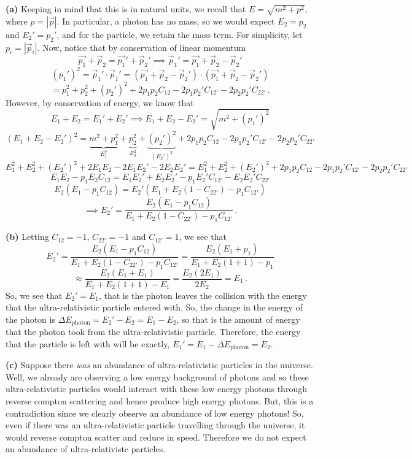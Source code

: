 \documentclass[10pt]{article}
\begin{document}
\textbf{(a)} Keeping in mind that this is in natural units, we recall that $E = \sqrt{m^{2} + p^{2}}$, where $p = |\vec{p}|$. In particular, a photon has no mass, so we would expect $E_{2} = p_{2}$ and $E_{2}' = p_{2}'$, and for the particle, we retain the mass term. For simplicity, let $p_{i} = |\vec{p}_{i}|$. Now, notice that by conservation of linear momentum
\[ \vec{p_{1}} + \vec{p}_{2} = \vec{p_{1}}' + \vec{p}_{2}' \implies \vec{p}_{1}' = \vec{p_{1}} + \vec{p}_{2}  - \vec{p}_{2}'\]
\[ (p_{1}')^{2} = \vec{p}_{1}' \cdot \vec{p}_{1}' = \left(\vec{p_{1}} + \vec{p}_{2}  - \vec{p}_{2}'\right)\cdot\left(\vec{p_{1}} + \vec{p}_{2}  - \vec{p}_{2}'\right)\]
\[ = p_{1}^{2} + p_{2}^{2} + (p_{2}')^{2} + 2p_{1}p_{2}C_{12} - 2p_{1}p_{2}'C_{12'} - 2p_{2}p_{2}'C_{22'} \, .\]
However, by conservation of energy, we know that
\[ E_{1} + E_{2} = E_{1}' + E_{2}' \implies E_{1} + E_{2} - E_{2}' = \sqrt{m^{2} +( p_{1}')^{2}}\]
\[ \left(E_{1} + E_{2} - E_{2}'\right)^{2} = \underbrace{m^{2} +  p_{1}^{2}}_{E_{1}^{2}} + \underbrace{p_{2}^{2}}_{E_{2}^{2}} + \underbrace{(p_{2}')^{2}}_{(E_{2}')^{2}} + 2p_{1}p_{2}C_{12} - 2p_{1}p_{2}'C_{12'} - 2p_{2}p_{2}'C_{22'}\]
\[ E_{1}^{2} + E_{2}^{2} + (E_{2}')^{2} + 2E_{1}E_{2} - 2E_{1}E_{2}' - 2E_{2}E_{2}' =  E_{1}^{2} + E_{2}^{2} + (E_{2}')^{2} + 2p_{1}p_{2}C_{12} - 2p_{1}p_{2}'C_{12'} - 2p_{2}p_{2}'C_{22'}\]
\[ E_{1}E_{2} - p_{1}E_{2}C_{12} =  E_{1}E_{2}' + E_{2}E_{2}' - p_{1}E_{2}'C_{12'} - E_{2}E_{2}'C_{22'}\]
\[ E_{2}(E_{1} - p_{1}C_{12}) = E_{2}'(E_{1} + E_{2}(1 - C_{22'}) - p_{1}C_{12'}) \]
\[ \implies E_{2}' = \frac{E_{2}(E_{1} - p_{1}C_{12})}{E_{1} + E_{2}(1 - C_{22'}) - p_{1}C_{12'}} \, .\]

\textbf{(b)} Letting $C_{12} = -1$, $C_{22'} = -1$ and $C_{12'} = 1$, we see that
\[ E_{2}' = \frac{E_{2}(E_{1} - p_{1}C_{12})}{E_{1} + E_{2}(1 - C_{22'}) - p_{1}C_{12'}} = \frac{E_{2}(E_{1} + p_{1})}{E_{1} + E_{2}(1 + 1) - p_{1}} \]
\[\approx \frac{E_{2}(E_{1} + E_{1})}{E_{1} + E_{2}(1 + 1) - E_{1}} = \frac{E_{2}(2E_{1})}{2E_{2}} = E_{1} \, .\]
So, we see that $E_{2}' = E_{1}$, that is the photon leaves the collision with the energy that the ultra-relativistic particle entered with. So, the change in the energy of the photon is $\Delta E_{\text{photon}} = E_{2}' - E_{2} = E_{1} - E_{2}$, so that is the amount of energy that the photon took from the ultra-relativistic particle. Therefore, the energy that the particle is left with will be exactly, $E_{1}' = E_{1} - \Delta E_{\text{photon}} = E_{2}$.

\textbf{(c)} Suppose there \textit{was} an abundance of ultra-relativistic particles in the universe. Well, we already are observing a low energy background of photons and so these ultra-relativistic particles would interact with these low energy photons through reverse compton scattering and hence produce high energy photons. But, this is a contradiction since we clearly observe an abundance of low energy photons! So, even if there was an ultra-relativistic particle travelling through the universe, it would reverse compton scatter and reduce in speed. Therefore we do not expect an abundance of ultra-relativistc particles.
\end{document}

